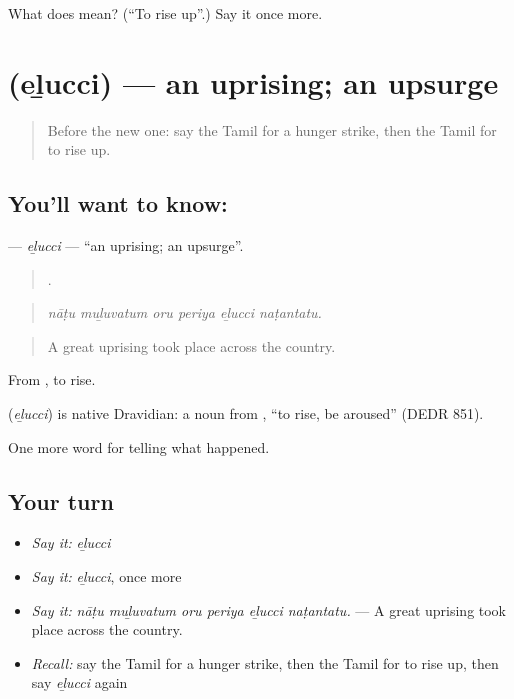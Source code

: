 \begin{tcolorbox}[breakable,colback=teal!4,colframe=teal!35!black,title={Before you move on}]
What does  mean? (\textquotedblleft{}To rise up\textquotedblright{}.) Say it once more.
\end{tcolorbox}
\section[\texorpdfstring{\ta{எழுச்சி} (eḻucci)}{எழுச்சி (eḻucci)}]{ (eḻucci) — an uprising; an upsurge}

\label{lesson:TA-C311-elucci}



\begin{quote}
Before the new one: say the Tamil for a hunger strike, then the Tamil for to rise up.
\end{quote}

\subsection*{You'll want to know: }
\textbf{} — \emph{eḻucci} — \textquotedblleft{}an uprising; an upsurge\textquotedblright{}.

\begin{quote}
     .
\end{quote}

\begin{quote}
\emph{nāṭu muḻuvatum oru periya eḻucci naṭantatu.}
\end{quote}

\begin{quote}
A great uprising took place across the country.
\end{quote}

From , to rise.

\begin{cousinweb}
\textbf{} (\emph{eḻucci}) is native Dravidian: a noun from , \textquotedblleft{}to rise, be aroused\textquotedblright{} (DEDR 851).
\end{cousinweb}

\begin{grammarlens}[title={What you've built}]
One more word for telling what happened.
\end{grammarlens}

\subsection*{Your turn}
\begin{itemize}
\raggedright
  \item \emph{Say it:} \emph{eḻucci}
  \item \emph{Say it:} \emph{eḻucci}, once more
  \item \emph{Say it:} \emph{nāṭu muḻuvatum oru periya eḻucci naṭantatu.} — A great uprising took place across the country.
  \item \emph{Recall:} say the Tamil for a hunger strike, then the Tamil for to rise up, then say \emph{eḻucci} again
\end{itemize}

